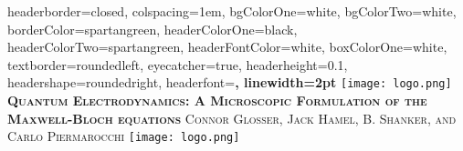 \documentclass[landscape,a0paper,fontscale=0.285]{baposter} %
\begin{document}
\begin{poster}
{
headerborder=closed, %
colspacing=1em, %
bgColorOne=white, %
bgColorTwo=white, %
borderColor=spartangreen, %
headerColorOne=black, %
headerColorTwo=spartangreen, %
headerFontColor=white, %
boxColorOne=white, %
textborder=roundedleft, %
eyecatcher=true, %
headerheight=0.1\textheight, %
headershape=roundedright, %
headerfont=\Large\bf\textsc, %
linewidth=2pt %
}
%
{\texttt{[image: logo.png]}} %
{\bf\textsc{Quantum Electrodynamics: A Microscopic Formulation of the Maxwell-Bloch equations}\vspace{0.2em}} %
{\textsc{Connor Glosser, Jack Hamel, B. Shanker, and Carlo Piermarocchi}} %
{\texttt{[image: logo.png]}} %







\end{poster}
\end{document}
